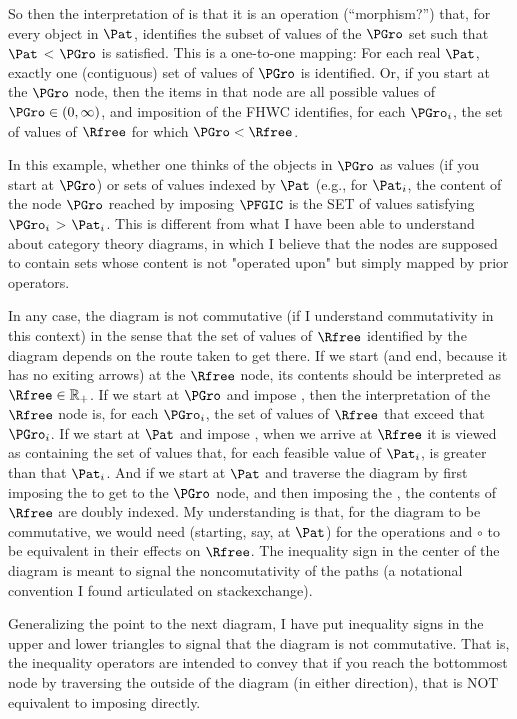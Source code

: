 \documentclass[\econtexRoot/BufferStockTheory]{subfiles}
\begin{document}
\begin{CDCPrivate}
So then the interpretation of {\PFGIC} is that it is an operation (``morphism?'') that, for every object in $\Pat$, identifies the subset of values of the $\PGro$ set such that $\Pat$ < $\PGro$ is satisfied. This is a one-to-one mapping: For each real $\Pat$, exactly one (contiguous) set of values of $\PGro$ is identified. Or, if you start at the $\PGro$ node, then the items in that node are all possible values of $\PGro \in (0,\infty)$, and imposition of the FHWC identifies, for each $\PGro_{i}$, the set of values of $\Rfree$ for which $\PGro < \Rfree$.

In this example, whether one thinks of the objects in $\PGro$ as values (if you start at $\PGro$) or sets of values indexed by $\Pat$ (e.g., for $\Pat_i$, the content of the node $\PGro$ reached by imposing $\PFGIC$ is the SET of values satisfying $\PGro_{i} $ > $\Pat_i$. This is different from what I have been able to understand about category theory diagrams, in which I believe that the nodes are supposed to contain sets whose content is not "operated upon" but simply mapped by prior operators.

In any case, the diagram is not commutative (if I understand commutativity in this context) in the sense that the set of values of $\Rfree$ identified by the diagram depends on the route taken to get there.  If we start (and end, because it has no exiting arrows) at the $\Rfree$ node, its contents should be interpreted as $\Rfree \in \mathbb{R}_{+}$.  If we start at $\PGro$ and impose {\FHWC}, then the interpretation of the $\Rfree$ node is, for each $\PGro_{i}$, the set of values of $\Rfree$ that exceed that $\PGro_{i}$.  If we start at $\Pat$ and impose {\RIC}, when we arrive at $\Rfree$ it is viewed as containing the set of values that, for each feasible value of $\Pat_{i}$, is greater than that $\Pat_{i}$. And if we start at $\Pat$ and traverse the diagram by first imposing the {\PFGIC} to get to the $\PGro$ node, and then imposing the {\FHWC}, the contents of $\Rfree$ are doubly indexed. My understanding is that, for the diagram to be commutative, we would need (starting, say, at $\Pat$) for the operations {\RIC} and {\PFGIC} $\circ$ {\FHWC} to be equivalent in their effects on $\Rfree$. The inequality sign in the center of the diagram is meant to signal the noncomutativity of the paths (a notational convention I found articulated on stackexchange).

Generalizing the point to the next diagram, I have put inequality signs in the upper and lower triangles to signal that the diagram is not commutative. That is, the inequality operators are intended to convey that if you reach the bottommost node by traversing the outside of the diagram (in either direction), that is NOT equivalent to imposing \PFFVAC directly.


\end{CDCPrivate}
\end{document}
